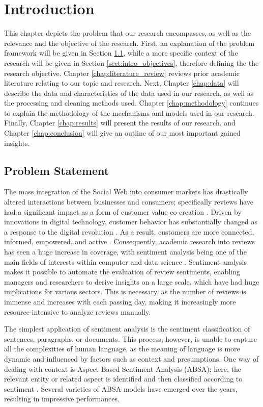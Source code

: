 \chapter{Introduction}
	\label{chap:introduction}
This chapter depicts the problem that our research encompasses, as well as the relevance and the objective of the research. First, an explanation of the problem framework will be given in Section \ref{sect:intro_problem}, while a more specific context of the research will be given in Section \ref{sect:intro_objectives}, therefore defining the the research objective. Chapter \ref{chap:literature_review} reviews prior academic literature relating to our topic and research. Next, Chapter \ref{chap:data} will describe the data and characteristics of the data used in our research, as well as the processing and cleaning methods used. Chapter \ref{chap:methodology} continues to explain the methodology of the mechanisms and models used in our research. Finally, Chapter \ref{chap:results} will present the results of our research, and Chapter \ref{chap:conclusion} will give an outline of our most important gained insights.

\section{Problem Statement}
    \label{sect:intro_problem}
The mass integration of the Social Web into consumer markets has drastically altered interactions between businesses and consumers; specifically reviews have had a significant impact as a form of customer value co-creation \cite{Shin}. Driven by innovations in digital technology, customer behavior has substantially changed as a response to the digital revolution \cite{Verhoef2}. As a result, customers are more connected, informed, empowered, and active \cite{Lamberton,Verhoef1}. Consequently, academic research into reviews has seen a huge increase in coverage, with sentiment analysis being one of the main fields of interests within computer and data science \cite{Liu}. Sentiment analysis makes it possible to automate the evaluation of review sentiments, enabling managers and researchers to derive insights on a large scale, which have had huge implications for various sectors. This is necessary, as the number of reviews is immense and increases with each passing day, making it increasingly more resource-intensive to analyze reviews manually.

The simplest application of sentiment analysis is the sentiment classification of sentences, paragraphs, or documents. This process, however, is unable to capture all the complexities of human language, as the meaning of language is more dynamic and influenced by factors such as context and presumptions. One way of dealing with context is Aspect Based Sentiment Analysis (ABSA); here, the relevant entity or related aspect is identified and then classified according to sentiment \cite{Schouten2}. Several varieties of ABSA models have emerged over the years, resulting in impressive performances.

